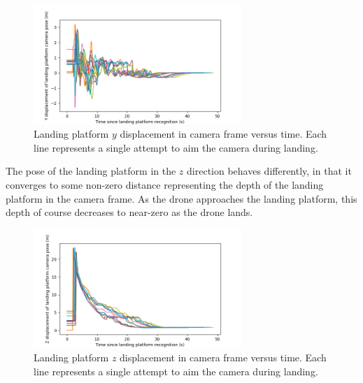 \begin{figure}[ht]
    \centering
    \includegraphics[width=0.7\textwidth]{images/y_displacement.png}
    \caption[Landing platform $y$ displacement in camera frame versus time.]{Landing platform $y$ displacement in camera frame versus time. Each line represents a single attempt to aim the camera during landing.}
    \label{subfig:y_displacement}
\end{figure}


The pose of the landing platform in the $z$ direction behaves differently, in that it converges to some non-zero distance representing the depth of the landing platform in the camera frame. As the drone approaches the landing platform, this depth of course decreases to near-zero as the drone lands.

\begin{figure}[ht]
    \centering
    \includegraphics[width=0.7\textwidth]{images/z_displacement.png}
    \caption[Landing platform $z$ displacement in camera frame versus time.]{Landing platform $z$ displacement in camera frame versus time. Each line represents a single attempt to aim the camera during landing.}
    \label{fig:gimbal_z_displacement}
\end{figure}